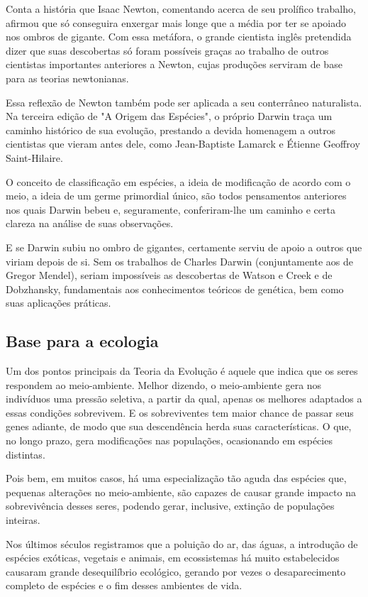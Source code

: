 \documentclass[12pt]{extarticle}
\begin{document}
Conta a história que Isaac Newton, comentando acerca de seu prolífico
trabalho, afirmou que só conseguira enxergar mais longe que a média por
ter se apoiado nos ombros de gigante. Com essa metáfora, o grande
cientista inglês pretendida dizer que suas descobertas só foram
possíveis graças ao trabalho de outros cientistas importantes anteriores
a Newton, cujas produções serviram de base para as teorias newtonianas.

Essa reflexão de Newton também pode ser aplicada a seu conterrâneo
naturalista. Na terceira edição de "A Origem das Espécies", o próprio
Darwin traça um caminho histórico de sua evolução, prestando a devida
homenagem a outros cientistas que vieram antes dele, como Jean-Baptiste
Lamarck e Étienne Geoffroy Saint-Hilaire.

O conceito de classificação em espécies, a ideia de modificação de
acordo com o meio, a ideia de um germe primordial único, são todos
pensamentos anteriores nos quais Darwin bebeu e, seguramente,
conferiram-lhe um caminho e certa clareza na análise de suas
observações.

E se Darwin subiu no ombro de gigantes, certamente serviu de apoio a
outros que viriam depois de si. Sem os trabalhos de Charles Darwin
(conjuntamente aos de Gregor Mendel), seriam impossíveis as descobertas
de Watson e Creek e de Dobzhansky, fundamentais aos conhecimentos
teóricos de genética, bem como suas aplicações práticas.

\subsection{Base para a ecologia}

Um dos pontos principais da Teoria da Evolução é aquele que indica que
os seres respondem ao meio-ambiente. Melhor dizendo, o meio-ambiente
gera nos indivíduos uma pressão seletiva, a partir da qual, apenas os
melhores adaptados a essas condições sobrevivem. E os sobreviventes tem
maior chance de passar seus genes adiante, de modo que sua descendência
herda suas características. O que, no longo prazo, gera modificações nas
populações, ocasionando em espécies distintas.

Pois bem, em muitos casos, há uma especialização tão aguda das espécies
que, pequenas alterações no meio-ambiente, são capazes de causar grande
impacto na sobrevivência desses seres, podendo gerar, inclusive,
extinção de populações inteiras.

Nos últimos séculos registramos que a poluição do ar, das águas, a
introdução de espécies exóticas, vegetais e animais, em ecossistemas há
muito estabelecidos causaram grande desequilíbrio ecológico, gerando por
vezes o desaparecimento completo de espécies e o fim desses ambientes de
vida.
\end{document}
